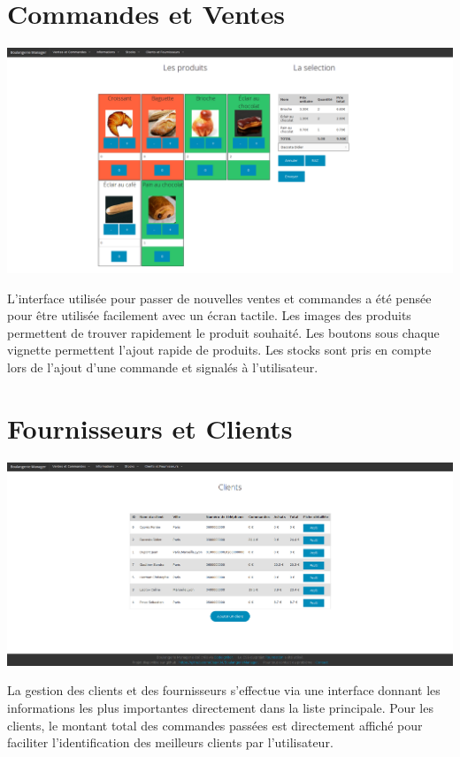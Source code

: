 \section{Commandes et Ventes}
\centerline{\includegraphics[width=1\textwidth]{images/ventes.png}}
L'interface utilisée pour passer de nouvelles ventes et commandes a été pensée
pour être utilisée facilement avec un écran tactile. Les images des produits
permettent de trouver rapidement le produit souhaité. Les boutons sous chaque
vignette permettent l'ajout rapide de produits. Les stocks sont pris en compte
lors de l'ajout d'une commande et signalés à l'utilisateur.

\section{Fournisseurs et Clients}
\centerline{\includegraphics[width=1\textwidth]{images/clients.png}}
La gestion des clients et des fournisseurs s'effectue via une interface donnant
les informations les plus importantes directement dans la liste principale.
Pour les clients, le montant total des commandes passées est directement affiché
pour faciliter l'identification des meilleurs clients par l'utilisateur.

